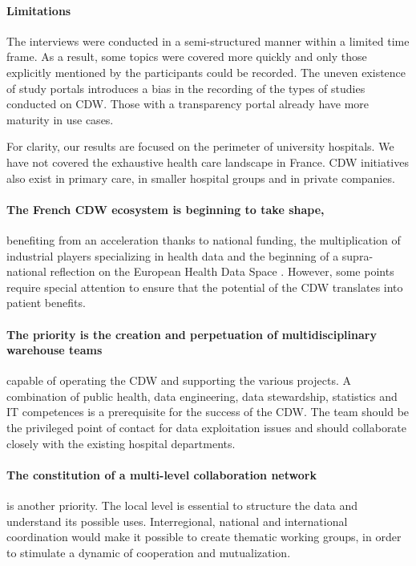 \documentclass[french,12pt,twoside,a4paper]{book}
\begin{document}
\paragraph{Limitations}

The interviews were conducted in a semi-structured manner within a limited time
frame. As a result, some topics were covered more quickly and only those
explicitly mentioned by the participants could be recorded. The uneven existence
of study portals introduces a bias in the recording of the types of studies
conducted on CDW. Those with a transparency portal already have more maturity in
use cases.

For clarity, our results are focused on the perimeter of university hospitals.
We have not covered the exhaustive health care landscape in France. CDW
initiatives also exist in primary care, in smaller hospital groups and in
private companies.

\paragraph{The French CDW ecosystem is beginning to take shape,} benefiting from
an acceleration thanks to national funding, the multiplication of industrial
players specializing in health data and the beginning of a supra-national
reflection on the European Health Data Space \citep{ehds_2022}. However, some
points require special attention to ensure that the potential of the CDW
translates into patient benefits.

\paragraph{The priority is the creation and perpetuation of multidisciplinary
  warehouse teams} capable of operating the CDW and supporting the various
projects. A combination of public health, data engineering, data stewardship,
statistics and IT competences is a prerequisite for the success of the CDW. The
team should be the privileged point of contact for data exploitation issues and
should collaborate closely with the existing hospital departments.

\paragraph{The constitution of a multi-level collaboration network} is another
priority. The local level is essential to structure the data and understand its
possible uses. Interregional, national and international coordination would make
it possible to create thematic working groups, in order to stimulate a dynamic
of cooperation and mutualization.
\end{document}
